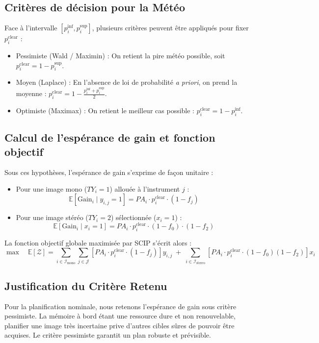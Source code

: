 \subsection{Critères de décision pour la Météo}
Face à l'intervalle $[p_i^{\inf}, p_i^{\sup}]$, plusieurs critères peuvent être appliqués pour fixer $p_i^{\text{clear}}$ :
\begin{itemize}
    \item Pessimiste (Wald / Maximin) : On retient la pire météo possible, soit $p_i^{\text{clear}} = 1 - p_i^{\sup}$.
    \item Moyen (Laplace) : En l'absence de loi de probabilité \textit{a priori}, on prend la moyenne : $p_i^{\text{clear}} = 1 - \frac{p_i^{\inf} + p_i^{\sup}}{2}$.
    \item Optimiste (Maximax) : On retient le meilleur cas possible : $p_i^{\text{clear}} = 1 - p_i^{\inf}$.
\end{itemize}

\subsection{Calcul de l'espérance de gain et fonction objectif}
Sous ces hypothèses, l'espérance de gain s'exprime de façon unitaire :
\begin{itemize}
    \item Pour une image mono ($TY_i = 1$) allouée à l'instrument $j$ :
    \begin{equation}
        \mathbb{E}[\text{Gain}_i \mid y_{i,j}=1] = PA_i \cdot p_i^{\text{clear}} \cdot (1 - f_j)
    \end{equation}
    \item Pour une image stéréo ($TY_i = 2$) sélectionnée ($x_i=1$) :
    \begin{equation}
        \mathbb{E}[\text{Gain}_i \mid x_i=1] = PA_i \cdot p_i^{\text{clear}} \cdot (1 - f_0) \cdot (1 - f_2)
    \end{equation}
\end{itemize}

La fonction objectif globale maximisée par SCIP s'écrit alors :
\begin{equation}
    \max \quad \mathbb{E}[\mathcal{Z}] = \sum_{i \in \mathcal{I}_{\text{mono}}} \sum_{j \in \mathcal{J}} \left[ PA_i \cdot p_i^{\text{clear}} \cdot (1 - f_j) \right] y_{i,j} \;+\; \sum_{i \in \mathcal{I}_{\text{stereo}}} \left[ PA_i \cdot p_i^{\text{clear}} \cdot (1 - f_0)(1 - f_2) \right] x_i \label{eq:obj}
\end{equation}

\subsection{Justification du Critère Retenu}
Pour la planification nominale, nous retenons l'espérance de gain sous critère pessimiste. La mémoire à bord étant une ressource dure et non renouvelable, planifier une image très incertaine prive d'autres cibles sûres de pouvoir être acquises. Le critère pessimiste garantit un plan robuste et prévisible.
